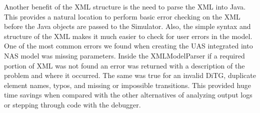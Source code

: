 Another benefit of the XML structure is the need to parse the XML into Java.  This provides a natural location to perform basic error checking on the XML before the Java objects are passed to the Simulator. Also, the simple syntax and structure of the XML makes it much easier to check for user errors in the model.  One of the most common errors we found when creating the UAS integrated into NAS model was missing parameters.  Inside the XMLModelParser if a required portion of XML was not found an error was returned with a description of the problem and where it occurred.  The same was true for an invalid DiTG, duplicate element names, typos, and missing or impossible transitions.  This provided huge time savings when compared with the other alternatives of analyzing output logs or stepping through code with the debugger.

